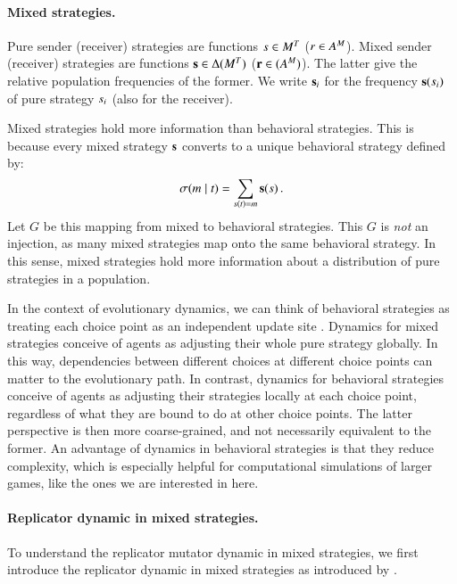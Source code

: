 \paragraph{Mixed strategies.} Pure sender (receiver) strategies are
functions $s \in M^T$ ($r \in
A^M$). Mixed sender (receiver) strategies are functions
$\mathrm{\mathbf{s}} \in \Delta(M^T)$ ($\mathrm{\mathbf{r}} \in
(A^M)$). The latter give the relative population frequencies
of the former. We write $\mathrm{\mathbf{s}}_i$ for the frequency
$\mathrm{\mathbf{s}}(s_i)$ of pure strategy $s_i$ (also for the
receiver). 

Mixed strategies hold more information than behavioral
strategies. This is because every mixed strategy $\mathrm{\mathbf{s}}$ converts to
a unique behavioral strategy defined by:
\begin{align*}
  \sigma(m \mid t) = \sum_{s(t) = m} \mathrm{\mathbf{s}}(s)\,.
\end{align*} 
Let $G$ be this mapping from mixed to behavioral strategies. This $G$
is \emph{not} an injection, as many mixed strategies map onto the same
behavioral strategy. In this sense, mixed strategies hold more
information about a distribution of pure strategies in a population.

In the context of evolutionary dynamics, we can think of behavioral
strategies as treating each choice point as an independent update site
\citep[e.g.][]{Cressman2003:Evolutionary-Dy,Sandholm2013:Population-Game}. Dynamics
for mixed strategies conceive of agents as adjusting their whole pure
strategy globally. In this way, dependencies between different choices
at different choice points can matter to the evolutionary path. In
contrast, dynamics for behavioral strategies conceive of agents as
adjusting their strategies locally at each choice point, regardless of
what they are bound to do at other choice points. The latter
perspective is then more coarse-grained, and not necessarily
equivalent to the former. An advantage of dynamics in behavioral
strategies is that they reduce complexity, which is especially helpful
for computational simulations of larger games, like the ones we are
interested in here.




\paragraph{Replicator dynamic in mixed strategies.} To understand the
replicator mutator dynamic in mixed strategies, we first introduce the
replicator dynamic in mixed strategies as introduced by
\citet{TaylorJonker1978:Evolutionary-St}. 

